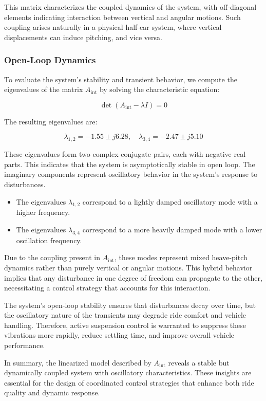 \documentclass[]{report}
\begin{document}
This matrix characterizes the coupled dynamics of the system, with off-diagonal elements indicating interaction between vertical and angular motions. Such coupling arises naturally in a physical half-car system, where vertical displacements can induce pitching, and vice versa.

\subsubsection{Open-Loop Dynamics}

To evaluate the system's stability and transient behavior, we compute the eigenvalues of the matrix \( A_{\text{int}} \) by solving the characteristic equation:

\[
\det(A_{\text{int}} - \lambda I) = 0
\]

The resulting eigenvalues are:

\[
\lambda_{1,2} = -1.55 \pm j6.28, \quad \lambda_{3,4} = -2.47 \pm j5.10
\]

These eigenvalues form two complex-conjugate pairs, each with negative real parts. This indicates that the system is asymptotically stable in open loop. The imaginary components represent oscillatory behavior in the system's response to disturbances.

\begin{itemize}
	\item The eigenvalues \( \lambda_{1,2} \) correspond to a lightly damped oscillatory mode with a higher frequency.
	\item The eigenvalues \( \lambda_{3,4} \) correspond to a more heavily damped mode with a lower oscillation frequency.
\end{itemize}

Due to the coupling present in \( A_{\text{int}} \), these modes represent mixed heave-pitch dynamics rather than purely vertical or angular motions. This hybrid behavior implies that any disturbance in one degree of freedom can propagate to the other, necessitating a control strategy that accounts for this interaction.

The system’s open-loop stability ensures that disturbances decay over time, but the oscillatory nature of the transients may degrade ride comfort and vehicle handling. Therefore, active suspension control is warranted to suppress these vibrations more rapidly, reduce settling time, and improve overall vehicle performance.

In summary, the linearized model described by \( A_{\text{int}} \) reveals a stable but dynamically coupled system with oscillatory characteristics. These insights are essential for the design of coordinated control strategies that enhance both ride quality and dynamic response.
\end{document}
